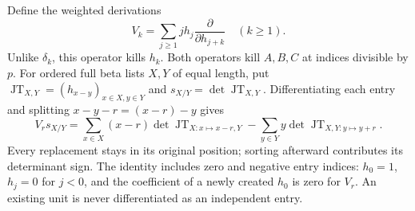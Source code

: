 \documentclass[11pt,a4paper]{amsart}
\numberwithin{equation}{section}
\theoremstyle{plain}
\theoremstyle{definition}
\begin{document}
Define the weighted derivations
\begin{equation}\label{eq:weighted-operator}
 V_k=\sum_{j\ge1}j h_j\frac{\partial}{\partial h_{j+k}}
 \quad(k\ge1).
\end{equation}
Unlike \(\delta_k\), this operator kills \(h_k\).  Both operators kill \(A,B,C\) at indices divisible by \(p\).  For ordered full beta lists \(X,Y\) of equal length, put \(\operatorname{JT}_{X,Y}=(h_{x-y})_{x\in X,y\in Y}\) and \(s_{X/Y}=\det\operatorname{JT}_{X,Y}\).  Differentiating each entry and splitting \(x-y-r=(x-r)-y\) gives
\begin{equation}\label{eq:weighted-beta-moves}
 V_r s_{X/Y}=
 \sum_{x\in X}(x-r)\det\operatorname{JT}_{X:x\mapsto x-r,Y}
 -\sum_{y\in Y}y\det\operatorname{JT}_{X,Y:y\mapsto y+r}.
\end{equation}
Every replacement stays in its original position; sorting afterward contributes its determinant sign.  The identity includes zero and negative entry indices: \(h_0=1\), \(h_j=0\) for \(j<0\), and the coefficient of a newly created \(h_0\) is zero for \(V_r\).  An existing unit is never differentiated as an independent entry.
\end{document}
